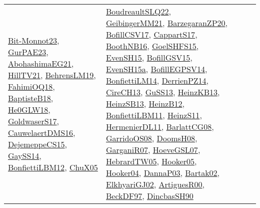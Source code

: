 {\begin{longtable}{lp{3cm}>{\raggedright}p{6cm}>{\raggedright}p{6cm}p{8cm}}
\href{papers/Bit-Monnot23.pdf}{Bit-Monnot23}\cite{Bit-Monnot23}, \href{articles/GurPAE23.pdf}{GurPAE23}\cite{GurPAE23}, \href{articles/AbohashimaEG21.pdf}{AbohashimaEG21}\cite{AbohashimaEG21}, \href{papers/HillTV21.pdf}{HillTV21}\cite{HillTV21}, \href{papers/BehrensLM19.pdf}{BehrensLM19}\cite{BehrensLM19}, \href{articles/FahimiOQ18.pdf}{FahimiOQ18}\cite{FahimiOQ18}, \href{articles/BaptisteB18.pdf}{BaptisteB18}\cite{BaptisteB18}, \href{papers/He0GLW18.pdf}{He0GLW18}\cite{He0GLW18}, \href{papers/GoldwaserS17.pdf}{GoldwaserS17}\cite{GoldwaserS17}, \href{papers/CauwelaertDMS16.pdf}{CauwelaertDMS16}\cite{CauwelaertDMS16}, \href{papers/DejemeppeCS15.pdf}{DejemeppeCS15}\cite{DejemeppeCS15}, \href{papers/GaySS14.pdf}{GaySS14}\cite{GaySS14}, \href{papers/BonfiettiLBM12.pdf}{BonfiettiLBM12}\cite{BonfiettiLBM12}, \href{papers/ChuX05.pdf}{ChuX05}\cite{ChuX05} & \href{papers/BoudreaultSLQ22.pdf}{BoudreaultSLQ22}\cite{BoudreaultSLQ22}, \href{papers/GeibingerMM21.pdf}{GeibingerMM21}\cite{GeibingerMM21}, \href{papers/BarzegaranZP20.pdf}{BarzegaranZP20}\cite{BarzegaranZP20}, \href{papers/BofillCSV17.pdf}{BofillCSV17}\cite{BofillCSV17}, \href{papers/CappartS17.pdf}{CappartS17}\cite{CappartS17}, \href{papers/BoothNB16.pdf}{BoothNB16}\cite{BoothNB16}, \href{articles/GoelSHFS15.pdf}{GoelSHFS15}\cite{GoelSHFS15}, \href{papers/EvenSH15.pdf}{EvenSH15}\cite{EvenSH15}, \href{papers/BofillGSV15.pdf}{BofillGSV15}\cite{BofillGSV15}, \href{articles/EvenSH15a.pdf}{EvenSH15a}\cite{EvenSH15a}, \href{papers/BofillEGPSV14.pdf}{BofillEGPSV14}\cite{BofillEGPSV14}, \href{papers/BonfiettiLM14.pdf}{BonfiettiLM14}\cite{BonfiettiLM14}, \href{papers/DerrienPZ14.pdf}{DerrienPZ14}\cite{DerrienPZ14}, \href{papers/CireCH13.pdf}{CireCH13}\cite{CireCH13}, \href{papers/GuSS13.pdf}{GuSS13}\cite{GuSS13}, \href{papers/HeinzKB13.pdf}{HeinzKB13}\cite{HeinzKB13}, \href{articles/HeinzSB13.pdf}{HeinzSB13}\cite{HeinzSB13}, \href{papers/HeinzB12.pdf}{HeinzB12}\cite{HeinzB12}, \href{papers/BonfiettiLBM11.pdf}{BonfiettiLBM11}\cite{BonfiettiLBM11}, \href{papers/HeinzS11.pdf}{HeinzS11}\cite{HeinzS11}, \href{papers/HermenierDL11.pdf}{HermenierDL11}\cite{HermenierDL11}, \href{papers/BarlattCG08.pdf}{BarlattCG08}\cite{BarlattCG08}, \href{articles/GarridoOS08.pdf}{GarridoOS08}\cite{GarridoOS08}, \href{papers/DoomsH08.pdf}{DoomsH08}\cite{DoomsH08}, \href{papers/GarganiR07.pdf}{GarganiR07}\cite{GarganiR07}, \href{papers/HoeveGSL07.pdf}{HoeveGSL07}\cite{HoeveGSL07}, \href{papers/HebrardTW05.pdf}{HebrardTW05}\cite{HebrardTW05}, \href{articles/Hooker05.pdf}{Hooker05}\cite{Hooker05}, \href{papers/Hooker04.pdf}{Hooker04}\cite{Hooker04}, \href{papers/DannaP03.pdf}{DannaP03}\cite{DannaP03}, \href{papers/Bartak02.pdf}{Bartak02}\cite{Bartak02}, \href{papers/ElkhyariGJ02.pdf}{ElkhyariGJ02}\cite{ElkhyariGJ02}, \href{articles/ArtiguesR00.pdf}{ArtiguesR00}\cite{ArtiguesR00}, \href{papers/BeckDF97.pdf}{BeckDF97}\cite{BeckDF97}, \href{articles/DincbasSH90.pdf}{DincbasSH90}\cite{DincbasSH90}\\

\end{longtable}}
